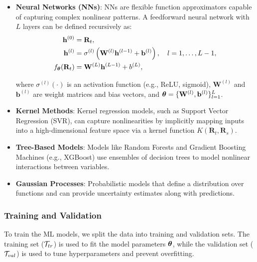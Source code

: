 \begin{itemize}
    \item \textbf{Neural Networks (NNs)}: NNs are flexible function approximators capable of capturing complex nonlinear patterns. A feedforward neural network with $L$ layers can be defined recursively as:
    $$
    \begin{aligned}
    \mathbf{h}^{(0)} &= \mathbf{R}_{t}, \\
    \mathbf{h}^{(l)} &= \sigma^{(l)}\left( \mathbf{W}^{(l)} \mathbf{h}^{(l-1)} + \mathbf{b}^{(l)} \right), \quad l = 1, \ldots, L-1, \\
    f_{\boldsymbol \theta}(\mathbf{R}_{t}) &= \mathbf{W}^{(L)} \mathbf{h}^{(L-1)} + b^{(L)},
    \end{aligned}
    $$

    where $\sigma^{(l)}(\cdot)$ is an activation function (e.g., ReLU, sigmoid), $\mathbf{W}^{(l)}$ and $\mathbf{b}^{(l)}$ are weight matrices and bias vectors, and $\boldsymbol \theta = \{ \mathbf{W}^{(l)}, \mathbf{b}^{(l)} \}_{l=1}^{L}$.

    \item \textbf{Kernel Methods}: Kernel regression models, such as Support Vector Regression (SVR), can capture nonlinearities by implicitly mapping inputs into a high-dimensional feature space via a kernel function $K(\mathbf{R}_{t}, \mathbf{R}_{s})$.

    \item \textbf{Tree-Based Models}: Models like Random Forests and Gradient Boosting Machines (e.g., XGBoost) use ensembles of decision trees to model nonlinear interactions between variables.

    \item \textbf{Gaussian Processes}: Probabilistic models that define a distribution over functions and can provide uncertainty estimates along with predictions.

\end{itemize}

\subsubsection{Training and Validation}

To train the ML models, we split the data into training and validation sets. The training set ($\mathcal{T}_{tr}$) is used to fit the model parameters $\boldsymbol \theta$, while the validation set ($\mathcal{T}_{val}$) is used to tune hyperparameters and prevent overfitting.

